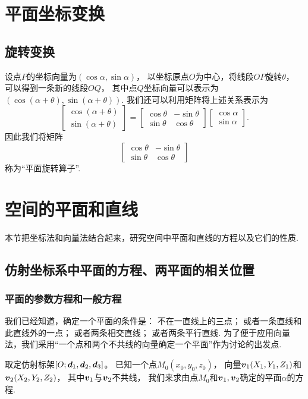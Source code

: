 \section{平面坐标变换}
\subsection{旋转变换}
设点\(P\)的坐标向量为\((\cos\alpha,\sin\alpha)\)，
以坐标原点\(O\)为中心，将线段\(OP\)旋转\(\theta\)，
可以得到一条新的线段\(OQ\)，
其中点\(Q\)坐标向量可以表示为\((\cos(\alpha+\theta),\sin(\alpha+\theta))\).
我们还可以利用矩阵将上述关系表示为\[
\begin{bmatrix}
	\cos(\alpha+\theta) \\
	\sin(\alpha+\theta)
\end{bmatrix}
= \begin{bmatrix}
	\cos\theta & -\sin\theta \\
	\sin\theta & \cos\theta
\end{bmatrix}
\begin{bmatrix}
	\cos\alpha \\
	\sin\alpha
\end{bmatrix}.
\]
因此我们将矩阵\[
\begin{bmatrix}
	\cos\theta & -\sin\theta \\
	\sin\theta & \cos\theta
\end{bmatrix}
\]
称为“平面旋转算子”.

\section{空间的平面和直线}
本节把坐标法和向量法结合起来，研究空间中平面和直线的方程以及它们的性质.

\subsection{仿射坐标系中平面的方程、两平面的相关位置}
\subsubsection{平面的参数方程和一般方程}
我们已经知道，确定一个平面的条件是：
不在一直线上的三点；
或者一条直线和此直线外的一点；
或者两条相交直线；
或者两条平行直线.
为了便于应用向量法，我们采用“一个点和两个不共线的向量确定一个平面”作为讨论的出发点.

取定仿射标架\([O;\boldsymbol{d}_1,\boldsymbol{d}_2,\boldsymbol{d}_3]\)。
已知一个点\(M_0(x_0,y_0,z_0)\)，
向量\(\boldsymbol{v}_1(X_1,Y_1,Z_1)\)和\(\boldsymbol{v}_2(X_2,Y_2,Z_2)\)，
其中\(\boldsymbol{v}_1\)与\(\boldsymbol{v}_2\)不共线，
我们来求由点\(M_0\)和\(\boldsymbol{v}_1,\boldsymbol{v}_2\)确定的平面\(\alpha\)的方程.

